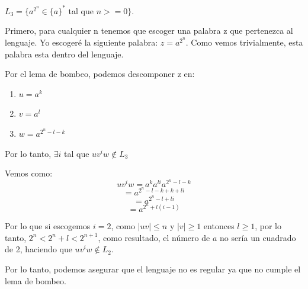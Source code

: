 \documentclass[12pt, spanish]{article}
\begin{document}
 \subsection{}
 $L_3 = \{ a^{2^n} \in \{a\}^{*} $ tal que  $ n >= 0 \}$.

Primero, para cualquier n tenemos que escoger una palabra z que pertenezca al lenguaje. Yo escogeré la siguiente palabra: $z = a^{2^n}$. Como vemos trivialmente, esta palabra esta dentro del lenguaje.

Por el lema de bombeo, podemos descomponer z en:

\begin{enumerate}
	\item $u = a^k$
	\item $v = a^l$
	\item $w =a^{2^n - l - k}$
\end{enumerate}

Por lo tanto, $\exists i$ tal que $uv^iw \not \in L_3$

Vemos como:
	$$uv^iw = a^ka^{li}a^{2^n - l - k}$$ 
	$$ =  a^{2^n - l - k + k + li}$$
	$$ =  a^{2^n - l  + li}$$
	$$ =  a^{2^n + l(i - 1)} $$
	

Por lo que si escogemos $i = 2$, como $|uv| \leq n$ y $|v| \geq 1$ entonces $l \geq 1$, por lo tanto, $2^n < 2^n+l < 2^{n+1}$, como resultado, el número de $a$ no sería un cuadrado de 2, haciendo que $uv^iw \not \in L_2$.

Por lo tanto, podemos asegurar que el lenguaje no es regular ya que no cumple el lema de bombeo.
\end{document}
